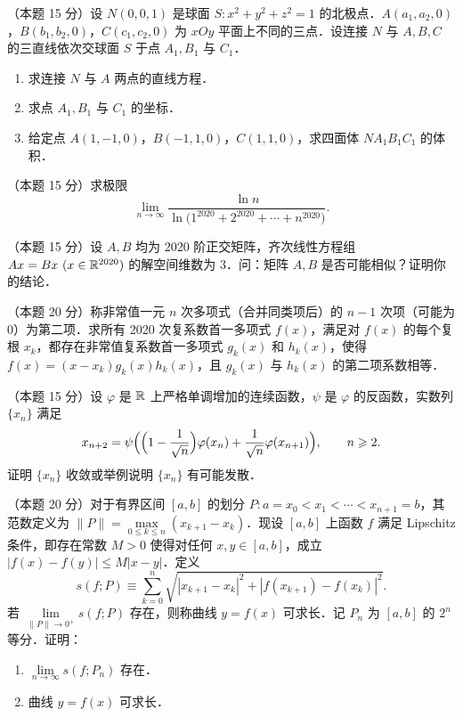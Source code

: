 
\begin{problems}

\item[一、]（本题 15 分）设 $N(0,0,1)$ 是球面 $S:x^2+y^2+z^2=1$ 的北极点．$A(a_1,a_2,0)$，$B(b_1,b_2,0)$，$C(c_1,c_2,0)$ 为 $xOy$ 平面上不同的三点．设连接 $N$ 与 $A,B,C$ 的三直线依次交球面 $S$ 于点 $A_1,B_1$ 与 $C_1$．
\begin{enumerate}
  \item 求连接 $N$ 与 $A$ 两点的直线方程．
  \item 求点 $A_1,B_1$ 与 $C_1$ 的坐标．
  \item 给定点 $A(1,-1,0)$，$B(-1,1,0)$，$C(1,1,0)$，求四面体 $NA_1B_1C_1$ 的体积．
\end{enumerate}

\item[二、]（本题 15 分）求极限
\[
  \lim_{n\to\infty}\frac{\ln n}{\ln\bigl(1^{2020}+2^{2020}+\cdots+n^{2020}\bigr)}.
\]

\item[三、]（本题 15 分）设 $A,B$ 均为 2020 阶正交矩阵，齐次线性方程组 $Ax=Bx\ (x\in\R^{2020})$ 的解空间维数为 $3$．问：矩阵 $A,B$ 是否可能相似？证明你的结论．

\item[四、]（本题 20 分）称非常值一元 $n$ 次多项式（合并同类项后）的 $n-1$ 次项（可能为 $0$）为第二项．求所有 2020 次复系数首一多项式 $f(x)$，满足对 $f(x)$ 的每个复根 $x_k$，都存在非常值复系数首一多项式 $g_k(x)$ 和 $h_k(x)$，使得 $f(x)=(x-x_k)g_k(x)h_k(x)$，且 $g_k(x)$ 与 $h_k(x)$ 的第二项系数相等．

\item[五、]（本题 15 分）设 $\varphi$ 是 $\mathbb{R}$ 上严格单调增加的连续函数，$\psi$ 是 $\varphi$ 的反函数，实数列 $\{x_n\}$ 满足
\[
  x_{n+2}=\psi\Bigl(\Bigl(1-\frac{1}{\sqrt{n}}\Bigr)\varphi(x_n)+\frac{1}{\sqrt{n}}\varphi(x_{n+1})\Bigr),\qquad n\geqslant 2.
\]
证明 $\{x_n\}$ 收敛或举例说明 $\{x_n\}$ 有可能发散．

\item[六、]（本题 20 分）对于有界区间 $[a,b]$ 的划分
$P:a=x_0<x_1<\cdots<x_{n+1}=b$，其范数定义为 $\|P\|=\max\limits_{0\leqslant k\leqslant n}(x_{k+1}-x_k)$．现设 $[a,b]$ 上函数 $f$ 满足 Lipschitz 条件，即存在常数 $M>0$ 使得对任何 $x,y\in[a,b]$，成立 $|f(x)-f(y)|\leqslant M|x-y|$．定义
\[
  s(f;P)\equiv\sum_{k=0}^{n}\sqrt{|x_{k+1}-x_k|^2+|f(x_{k+1})-f(x_k)|^2}.
\]
若 $\lim\limits_{\|P\|\to 0^+}s(f;P)$ 存在，则称曲线 $y=f(x)$ 可求长．记 $P_n$ 为 $[a,b]$ 的 $2^n$ 等分．证明：
\begin{enumerate}
  \item $\lim\limits_{n\to\infty}s(f;P_n)$ 存在．
  \item 曲线 $y=f(x)$ 可求长．
\end{enumerate}

\end{problems}
